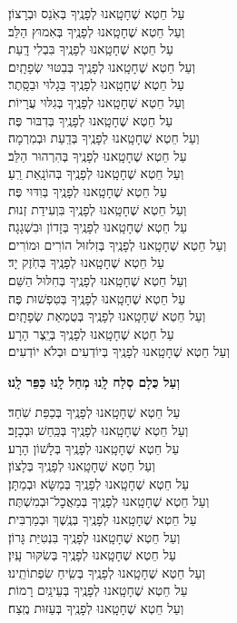 \documentclass[twoside, openany, parskip=half, 11pt]{book}
\begin{document}
עַל חֵטְא שֶׁחָטָֽאנוּ לְפָנֶֽיךָ בְּאֹֽנֵס וּבְרָצוֹן׃\\ וְעַל חֵטְא שֶׁחָטָֽאנוּ לְפָנֶֽיךָ בְּאִמוּץ הַלֵּב׃ \\
עַל חֵטְא שֶׁחָטָֽאנוּ לְפָנֶֽיךָ בִּבְלִי דָֽעַת׃ \\ וְעַל חֵטְא שֶׁחָטָֽאנוּ לְפָנֶֽיךָ בְּבִטּוּי שְׂפָתָֽיִם׃\\
עַל חֵטְא שֶׁחָטָֽאנוּ לְפָנֶֽיךָ בַּגָלוּי וּבַסָּֽתֶר׃ \\ וְעַל חֵטְא שֶׁחָטָֽאנוּ לְפָנֶֽיךָ בְּגִלּוּי עֲרָיוֹת׃ \\
עַל חֵטְא שֶׁחָטָֽאנוּ לְפָנֶֽיךָ בְּדִבּוּר פֶּה׃ \\ וְעַל חֵטְא שֶׁחָטָֽאנוּ לְפָנֶֽיךָ בְּדַֽעַת וּבְמִרְמָה׃ \\
עַל חֵטְא שֶׁחָטָֽאנוּ לְפָנֶֽיךָ בְּהִרְהוּר הַלֵּב׃ \\ וְעַל חֵטְא שֶׁחָטָֽאנוּ לְפָנֶֽיךָ בְּהוֹנָֽאַת רֵֽעַ׃ \\
עַל חֵטְא שֶׁחָטָֽאנוּ לְפָנֶֽיךָ בְּוִדּוּי פֶּה׃\\ וְעַל חֵטְא שֶׁחָטָֽאנוּ לְפָנֶֽיךָ בִּוְעִידַת זְנוּת׃ \\
עַל חֵטְא שֶׁחָטָֽאנוּ לְפָנֶֽיךָ בְּזָדוֹן וּבִשְׁגָגָה׃ \\ וְעַל חֵטְא שֶׁחָטָֽאנוּ לְפָנֶֽיךָ בְּזִלזוּל הוֹרִים וּמוֹרִים׃\\
עַל חֵטְא שֶׁחָטָֽאנוּ לְפָנֶֽיךָ בְּחֹֽזֶק יָד׃ \\ וְעַל חֵטְא שֶׁחָטָֽאנוּ לְפָנֶֽיךָ בְּחִלּוּל הַשֵּׁם׃ \\
עַל חֵטְא שֶׁחָטָֽאנוּ לְפָנֶֽיךָ בְּטִפְשׁוּת פֶּה׃ \\ וְעַל חֵטְא שֶׁחָטָֽאנוּ לְפָנֶֽיךָ בְּטֻמְאַת שְׂפָתָֽיִם׃ \\
עַל חֵטְא שֶׁחָטָֽאנוּ לְפָנֶֽיךָ בְּיֵֽצֶר הָרָע׃ \\ וְעַל חֵטְא שֶׁחָטָֽאנוּ לְפָנֶֽיךָ בְּיוֹדְעִים וּבְלֹא יוֹדְעִים׃

\textbf{וְעַל כֻּלָם סְלַח לָֽנוּ מְחַל לָֽנוּ כַּפֵּר לָֽנוּ׃}

עַל חֵטְא שֶׁחָטָֽאנוּ לְפָנֶֽיךָ בְּכַפַּת שֹֽׁחַד׃ \\ וְעַל חֵטְא שֶׁחָטָֽאנוּ לְפָנֶֽיךָ בְּכַּֽחַשׁ וּבְכָזָב׃ \\
עַל חֵטְא שֶׁחָטָֽאנוּ לְפָנֶֽיךָ בְּלָשׁוֹן הָרָע׃\\ וְעַל חֵטְא שֶׁחָטָֽאנוּ לְפָנֶֽיךָ בְּלָצוֹן׃\\
עַל חֵטְא שֶׁחָטָֽאנוּ לְפָנֶֽיךָ בְּמַשָּׂא וּבְמַתָּן׃ \\ וְעַל חֵטְא שֶׁחָטָֽאנוּ לְפָנֶֽיךָ בְּמַאֲכׇל־וּבְמִשְׁתֶּה׃\\
עַל חֵטְא שֶׁחָטָֽאנוּ לְפָנֶֽיךָ בְּנֶֽשֶׁךְ וּבְמַרְבִּית׃\\ וְעַל חֵטְא שֶׁחָטָֽאנוּ לְפָנֶֽיךָ בִּנְטִיַּת גָּרוֹן׃ \\
עַל חֵטְא שֶׁחָטָֽאנוּ לְפָנֶֽיךָ בְּשִׂקּוּר עָֽיִן׃\\ וְעַל חֵטְא שֶׁחָטָֽאנוּ לְפָנֶֽיךָ בְּשִֽׂיחַ שִׂפְתוֹתֵֽינוּ׃ \\
עַל חֵטְא שֶׁחָטָֽאנוּ לְפָנֶֽיךָ בְּעֵינַֽיִם רָמוֹת׃\\ וְעַל חֵטְא שֶׁחָטָֽאנוּ לְפָנֶֽיךָ בְּעַזּוּת מֶֽצַח׃
\end{document}
